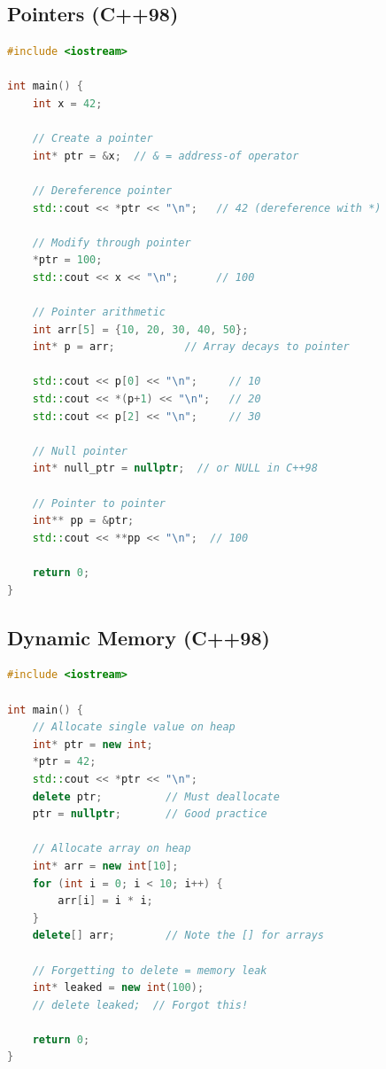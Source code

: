 \hypertarget{pointers-c98}{%
\subsection{Pointers (C++98)}\label{pointers-c98}}

\begin{lstlisting}[language={C++}]
#include <iostream>

int main() {
    int x = 42;
    
    // Create a pointer
    int* ptr = &x;  // & = address-of operator
    
    // Dereference pointer
    std::cout << *ptr << "\n";   // 42 (dereference with *)
    
    // Modify through pointer
    *ptr = 100;
    std::cout << x << "\n";      // 100
    
    // Pointer arithmetic
    int arr[5] = {10, 20, 30, 40, 50};
    int* p = arr;           // Array decays to pointer
    
    std::cout << p[0] << "\n";     // 10
    std::cout << *(p+1) << "\n";   // 20
    std::cout << p[2] << "\n";     // 30
    
    // Null pointer
    int* null_ptr = nullptr;  // or NULL in C++98
    
    // Pointer to pointer
    int** pp = &ptr;
    std::cout << **pp << "\n";  // 100
    
    return 0;
}
\end{lstlisting}

\hypertarget{dynamic-memory-c98}{%
\subsection{Dynamic Memory (C++98)}\label{dynamic-memory-c98}}

\begin{lstlisting}[language={C++}]
#include <iostream>

int main() {
    // Allocate single value on heap
    int* ptr = new int;
    *ptr = 42;
    std::cout << *ptr << "\n";
    delete ptr;          // Must deallocate
    ptr = nullptr;       // Good practice
    
    // Allocate array on heap
    int* arr = new int[10];
    for (int i = 0; i < 10; i++) {
        arr[i] = i * i;
    }
    delete[] arr;        // Note the [] for arrays
    
    // Forgetting to delete = memory leak
    int* leaked = new int(100);
    // delete leaked;  // Forgot this!
    
    return 0;
}
\end{lstlisting}
